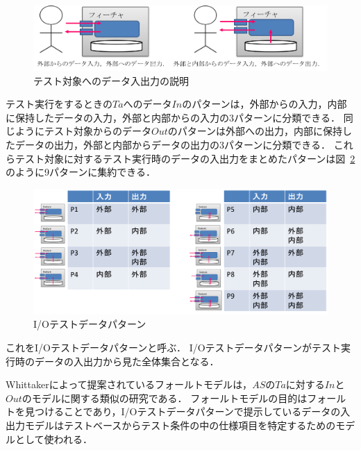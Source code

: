\begin{figure}[htbp]
 \begin{center}
 \includegraphics[width=12cm]{./image/D-3-Fig4.png}
 \caption{テスト対象へのデータ入出力の説明}
 \label{fig:D-3-Fig4}
 \end{center}
\end{figure}

テスト実行をするときの$Ta$へのデータ$In$のパターンは，外部からの入力，内部に保持したデータの入力，外部と内部からの入力の3パターンに分類できる．
同じようにテスト対象からのデータ$Out$のパターンは外部への出力，内部に保持したデータの出力，外部と内部からデータの出力の3パターンに分類できる．
これらテスト対象に対するテスト実行時のデータの入出力をまとめたパターンは図~\ref{fig:D-4-Fig6}のように9パターンに集約できる．

\begin{figure}[htbp]
\begin{center}
\includegraphics[width=14cm]{./image/D-3-Fig5.png}
\caption{I/Oテストデータパターン}
\label{fig:D-4-Fig6}
\end{center}
\end{figure}

これをI/Oテストデータパターンと呼ぶ\cite{yumoto2015IPA}．
I/Oテストデータパターンがテスト実行時のデータの入出力から見た全体集合となる．

Whittakerによって提案されているフォールトモデル\cite{whittaker2003break}は，$AS$の$Ta$に対する$In$と$Out$のモデルに関する類似の研究である．
フォールトモデルの目的はフォールトを見つけることであり，I/Oテストデータパターンで提示しているデータの入出力モデルはテストベースからテスト条件の中の仕様項目を特定するためのモデルとして使われる．

